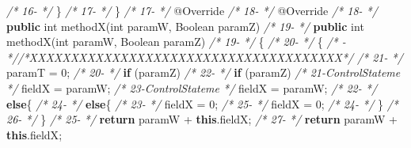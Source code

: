 \documentclass[
]{article}
\newenvironment{Shaded}{\begin{snugshade}}{\end{snugshade}}
\newcommand{\AttributeTok}[1]{\textcolor[rgb]{0.77,0.63,0.00}{#1}}
\newcommand{\BuiltInTok}[1]{#1}
\newcommand{\CommentTok}[1]{\textcolor[rgb]{0.56,0.35,0.01}{\textit{#1}}}
\newcommand{\DataTypeTok}[1]{\textcolor[rgb]{0.13,0.29,0.53}{#1}}
\newcommand{\DecValTok}[1]{\textcolor[rgb]{0.00,0.00,0.81}{#1}}
\newcommand{\FunctionTok}[1]{\textcolor[rgb]{0.00,0.00,0.00}{#1}}
\newcommand{\KeywordTok}[1]{\textcolor[rgb]{0.13,0.29,0.53}{\textbf{#1}}}
\newcommand{\NormalTok}[1]{#1}
\begin{document}
\begin{landscape}
\begin{Shaded}
\begin{Highlighting}[]
\CommentTok{/* 16-                 */}\NormalTok{    \}                                                          }\CommentTok{/* 17-                 */}\NormalTok{    \}                                                          }
\CommentTok{/* 17-                 */}    \AttributeTok{@Override}                                                  \CommentTok{/* 18-                 */}    \AttributeTok{@Override}                                                  
\CommentTok{/* 18-                 */}    \KeywordTok{public} \DataTypeTok{int} \FunctionTok{methodX}\NormalTok{(}\DataTypeTok{int}\NormalTok{ paramW, }\BuiltInTok{Boolean}\NormalTok{ paramZ)             }\CommentTok{/* 19-                 */}    \KeywordTok{public} \DataTypeTok{int} \FunctionTok{methodX}\NormalTok{(}\DataTypeTok{int}\NormalTok{ paramW, }\BuiltInTok{Boolean}\NormalTok{ paramZ)             }
\CommentTok{/* 19-                 */}\NormalTok{    \{                                                          }\CommentTok{/* 20-                 */}\NormalTok{    \{                                                          }
\CommentTok{/*   -                 *//*XXXXXXXXXXXXXXXXXXXXXXXXXXXXXXXXXXXXXX*/}                     \CommentTok{/* 21-                 */}\NormalTok{        paramT = }\DecValTok{0}\NormalTok{;                                            }
\CommentTok{/* 20-                 */}        \KeywordTok{if}\NormalTok{ (paramZ)                                            }\CommentTok{/* 22-                 */}        \KeywordTok{if}\NormalTok{ (paramZ)                                            }
\CommentTok{/* 21-ControlStateme   */}\NormalTok{            fieldX = paramW;                                   }\CommentTok{/* 23-ControlStateme   */}\NormalTok{            fieldX = paramW;                                   }
\CommentTok{/* 22-                 */}        \KeywordTok{else}\NormalTok{\{                                                  }\CommentTok{/* 24-                 */}        \KeywordTok{else}\NormalTok{\{                                                  }
\CommentTok{/* 23-                 */}\NormalTok{            fieldX = }\DecValTok{0}\NormalTok{;                                        }\CommentTok{/* 25-                 */}\NormalTok{            fieldX = }\DecValTok{0}\NormalTok{;                                        }
\CommentTok{/* 24-                 */}\NormalTok{        \}                                                      }\CommentTok{/* 26-                 */}\NormalTok{        \}                                                      }
\CommentTok{/* 25-                 */}        \KeywordTok{return}\NormalTok{ paramW + }\KeywordTok{this}\NormalTok{.}\FunctionTok{fieldX}\NormalTok{;                           }\CommentTok{/* 27-                 */}        \KeywordTok{return}\NormalTok{ paramW + }\KeywordTok{this}\NormalTok{.}\FunctionTok{fieldX}\NormalTok{;                           }

\end{Highlighting}
\end{Shaded}
\end{landscape}
\end{document}
